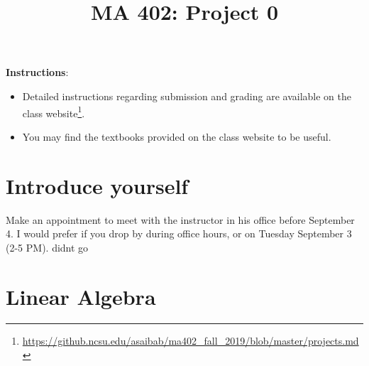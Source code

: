 \documentclass[answers,10pt]{exam}
\title{MA 402: Project 0}
\date{}
\begin{document}
\maketitle

\textbf{Instructions}: 



\begin{itemize}

\item Detailed instructions regarding submission and grading are available on the class website\footnote{\url{https://github.ncsu.edu/asaibab/ma402_fall_2019/blob/master/projects.md}}.

\item You may find the textbooks provided on the class website to be useful.

\end{itemize}



\vspace{2mm}

\section*{Introduce yourself}

\begin{questions} 

\question [5 bonus] Make an appointment to meet with the instructor in his office before September 4. I would prefer if you drop by during office hours, or on Tuesday September 3 (2-5 PM). didnt go

\end{questions}

\section*{Linear Algebra}
\end{document}
